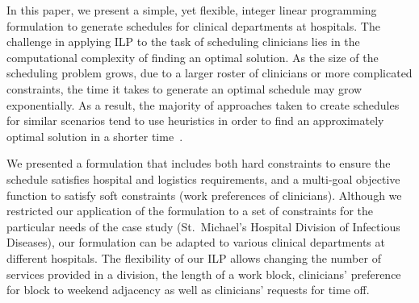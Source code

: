 In this paper, we present a simple, yet flexible, integer linear programming
formulation to generate schedules for clinical departments at hospitals.
The challenge in applying ILP to the task of scheduling clinicians lies in the
computational complexity of finding an optimal solution. As the size of the
scheduling problem grows, due to a larger roster of clinicians or more
complicated constraints, the time it takes to generate an optimal schedule may
grow exponentially.
As a result, the majority of approaches taken to create schedules for similar
scenarios tend to use heuristics in order to find an approximately optimal
solution in a shorter time~\cite{burke_state_2004}. %


We presented a formulation that includes both hard constraints to ensure the
schedule satisfies hospital and logistics requirements, and a multi-goal
objective function to satisfy soft constraints (work preferences of clinicians).
Although we restricted our application of the formulation to a set of
constraints for the particular needs of the case study (St.\ Michael's Hospital
Division of Infectious Diseases), our formulation can be adapted to various
clinical departments at different hospitals. The flexibility of our ILP allows
changing the number of services provided in a division, the length of a work
block, clinicians' preference for block to weekend adjacency as well as
clinicians' requests for time off.

